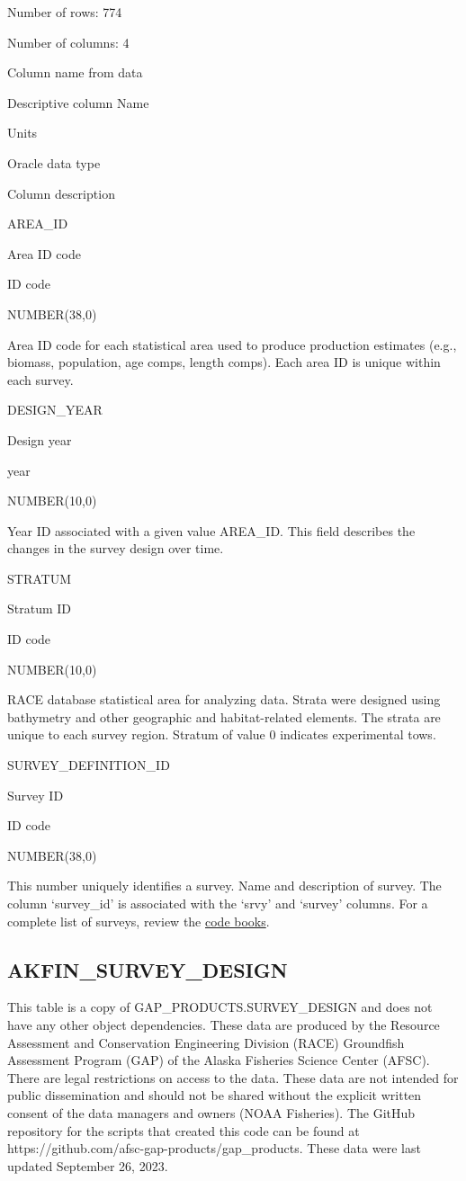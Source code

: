 \documentclass[
  letterpaper,
  oneside,
  open=any]{scrbook}
\begin{document}
Number of rows: 774

Number of columns: 4

Column name from data

Descriptive column Name

Units

Oracle data type

Column description

AREA\_ID

Area ID code

ID code

NUMBER(38,0)

Area ID code for each statistical area used to produce production
estimates (e.g., biomass, population, age comps, length comps). Each
area ID is unique within each survey.

DESIGN\_YEAR

Design year

year

NUMBER(10,0)

Year ID associated with a given value AREA\_ID. This field describes the
changes in the survey design over time.

STRATUM

Stratum ID

ID code

NUMBER(10,0)

RACE database statistical area for analyzing data. Strata were designed
using bathymetry and other geographic and habitat-related elements. The
strata are unique to each survey region. Stratum of value 0 indicates
experimental tows.

SURVEY\_DEFINITION\_ID

Survey ID

ID code

NUMBER(38,0)

This number uniquely identifies a survey. Name and description of
survey. The column `survey\_id' is associated with the `srvy' and
`survey' columns. For a complete list of surveys, review the
\href{https://www.fisheries.noaa.gov/resource/document/groundfish-survey-species-code-manual-and-data-codes-manual}{code
books}.

\hypertarget{akfin_survey_design}{%
\subsection{AKFIN\_SURVEY\_DESIGN}\label{akfin_survey_design}}

This table is a copy of GAP\_PRODUCTS.SURVEY\_DESIGN and does not have
any other object dependencies. These data are produced by the Resource
Assessment and Conservation Engineering Division (RACE) Groundfish
Assessment Program (GAP) of the Alaska Fisheries Science Center (AFSC).
There are legal restrictions on access to the data. These data are not
intended for public dissemination and should not be shared without the
explicit written consent of the data managers and owners (NOAA
Fisheries). The GitHub repository for the scripts that created this code
can be found at https://github.com/afsc-gap-products/gap\_products.
These data were last updated September 26, 2023.
\end{document}
